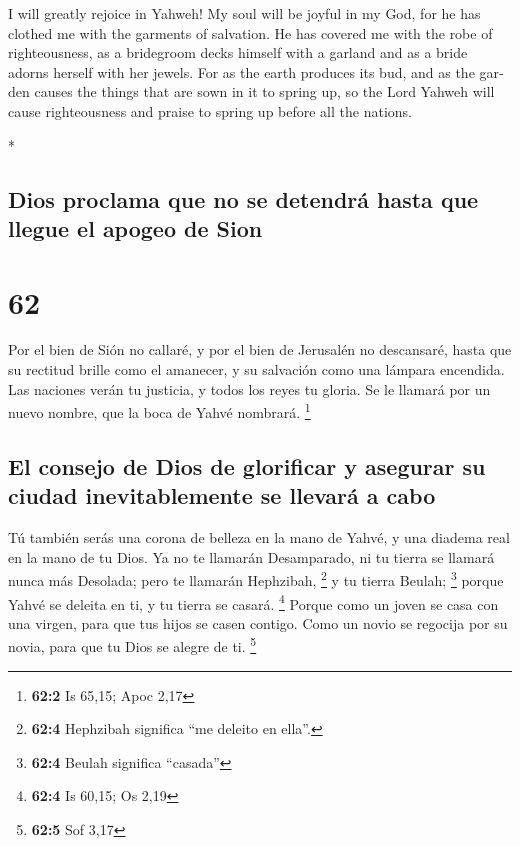 \begin{paracol}{2}
\begin{otherlanguage}{english}
 I will greatly rejoice in Yahweh! My soul will be joyful
in my God, for he has clothed me with the garments of salvation. He has
covered me with the robe of righteousness, as a bridegroom decks himself
with a garland and as a bride adorns herself with her jewels.
 For as the earth produces its bud, and as the garden
causes the things that are sown in it to spring up, so the Lord Yahweh
will cause righteousness and praise to spring up before all the nations.

\end{otherlanguage}

\switchcolumn[0]*

\hypertarget{dios-proclama-que-no-se-detendruxe1-hasta-que-llegue-el-apogeo-de-sion}{%
\subsection{Dios proclama que no se detendrá hasta que llegue el apogeo
de
Sion}\label{dios-proclama-que-no-se-detendruxe1-hasta-que-llegue-el-apogeo-de-sion}}

\hypertarget{section-122}{%
\section{62}\label{section-122}}

 Por el bien de Sión no callaré, y por el bien de
Jerusalén no descansaré, hasta que su rectitud brille como el amanecer,
y su salvación como una lámpara encendida.  Las naciones
verán tu justicia, y todos los reyes tu gloria. Se le llamará por un
nuevo nombre, que la boca de Yahvé nombrará. \footnote{\textbf{62:2} Is
  65,15; Apoc 2,17}

\hypertarget{el-consejo-de-dios-de-glorificar-y-asegurar-su-ciudad-inevitablemente-se-llevaruxe1-a-cabo}{%
\subsection{El consejo de Dios de glorificar y asegurar su ciudad
inevitablemente se llevará a
cabo}\label{el-consejo-de-dios-de-glorificar-y-asegurar-su-ciudad-inevitablemente-se-llevaruxe1-a-cabo}}

 Tú también serás una corona de belleza en la mano de
Yahvé, y una diadema real en la mano de tu Dios.  Ya no te
llamarán Desamparado, ni tu tierra se llamará nunca más Desolada; pero
te llamarán Hephzibah, \footnote{\textbf{62:4} Hephzibah significa ``me
  deleito en ella''.} y tu tierra Beulah; \footnote{\textbf{62:4} Beulah
  significa ``casada''} porque Yahvé se deleita en ti, y tu tierra se
casará. \footnote{\textbf{62:4} Is 60,15; Os 2,19}  Porque
como un joven se casa con una virgen, para que tus hijos se casen
contigo. Como un novio se regocija por su novia, para que tu Dios se
alegre de ti. \footnote{\textbf{62:5} Sof 3,17}


\end{paracol}
